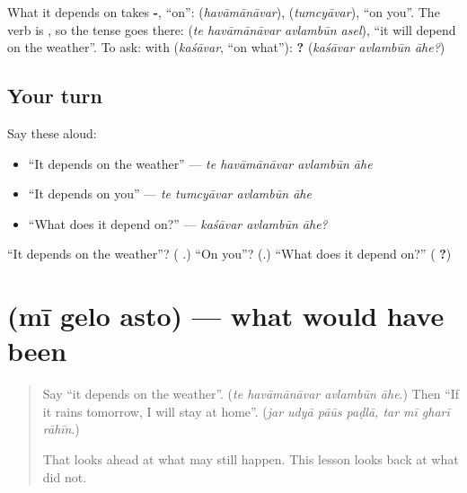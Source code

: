 What it depends on takes \textbf{-}, \textquotedblleft{}on\textquotedblright{}: \textbf{} (\emph{havāmānāvar}), \textbf{} (\emph{tumcyāvar}), \textquotedblleft{}on you\textquotedblright{}. The verb is \textbf{}, so the tense goes there: \textbf{   } (\emph{te havāmānāvar avlambūn asel}), \textquotedblleft{}it will depend on the weather\textquotedblright{}. To ask: with \textbf{} (\emph{kaśāvar}, \textquotedblleft{}on what\textquotedblright{}): \textbf{  ?} (\emph{kaśāvar avlambūn āhe?})

\subsection*{Your turn}
Say these aloud:

\begin{itemize}
\raggedright
  \item \textquotedblleft{}It depends on the weather\textquotedblright{} — \emph{te havāmānāvar avlambūn āhe}
  \item \textquotedblleft{}It depends on you\textquotedblright{} — \emph{te tumcyāvar avlambūn āhe}
  \item \textquotedblleft{}What does it depend on?\textquotedblright{} — \emph{kaśāvar avlambūn āhe?}
\end{itemize}

\begin{tcolorbox}[breakable,colback=teal!4,colframe=teal!35!black,title={Before you move on}]
\textquotedblleft{}It depends on the weather\textquotedblright{}? (\textbf{   }.) \textquotedblleft{}On you\textquotedblright{}? (\textbf{}.) \textquotedblleft{}What does it depend on?\textquotedblright{} (\textbf{  ?})
\end{tcolorbox}
\section[\texorpdfstring{\mr{मी} \mr{गेलो} \mr{असतो} (mī gelo asto)}{मी गेलो असतो (mī gelo asto)}]{   (mī gelo asto) — what would have been}

\label{lesson:MR-C287-gelo-asto}



\begin{quote}
Say \textquotedblleft{}it depends on the weather\textquotedblright{}. (\emph{te havāmānāvar avlambūn āhe}.) Then \textquotedblleft{}If it rains tomorrow, I will stay at home\textquotedblright{}. (\emph{jar udyā pāūs paḍlā, tar mī gharī rāhīn}.)

That looks ahead at what may still happen. This lesson looks back at what did not.
\end{quote}

